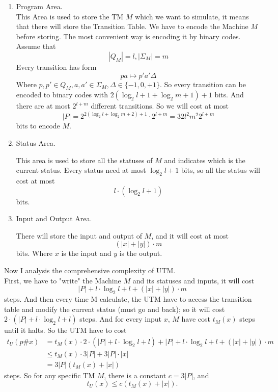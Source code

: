 \documentclass[a4papper]{article}
\theoremstyle{neosn}
\begin{document}
    \begin{enumerate}
        \item Program Area.\\
            This Area is used to store the TM $M$ which we want to simulate, it means that
            there will store the Transition Table.
            We have to encode the Machine $M$ before storing.
            The most convenient way is encoding it by binary codes.
            Assume that
            \[
                |Q_M| = l, |\Sigma_M| = m
            \]
            Every transition has form
            \[
                pa \mapsto p'a'\Delta
            \]
            Where $p,p' \in Q_M, a,a' \in \Sigma_M, \Delta \in \{-1,0,+1\}$.
            So every transition can be encoded to binary codes with $2(\log_2 l + 1 + \log_2 m + 1)+1$ bits.
            And there are at most $2^{l+m}$ different transitions.
            So we will cost at most
            \[
                |P| = 2^{2(\log_2 l + \log_2 m +2) + 1} \cdot 2^{l+m} = 32l^2 m^2 2^{l+m}
            \]
            bits to encode $M$. \\

        \item Status Area.

            This area is used to store all the statuses of $M$ and indicates which is the current status.
            Every status need at most $\log_2 l + 1$ bits, so all the status will cost at most
            \[
                l \cdot (\log_2 l + 1)
            \]
            bits.

        \item Input and Output Area.

            There will store the input and output of $M$, and it will cost at most
            \[
                (|x| + |y|) \cdot m
            \]
            bits.
            Where $x$ is the input and $y$ is the output.
    \end{enumerate}

    Now I analysis the comprehensive complexity of UTM. \\

    First, we have to "write" the Machine $M$ and its statuses and inputs, it will cost
    \[
        |P| + l\cdot \log_2 l + l + (|x|+|y|) \cdot m
    \]
    steps.
    And then every time M calculate, the UTM have to access the transition table and modify the
    current status (must go and back);
    so it will cost $2\cdot(|P| + l\cdot \log_2 l+l)$ steps.
    And for every input $x$, $M$ have cost $t_M(x)$ steps until it halts.
    So the UTM have to cost
    \[
        \begin{array}{ll}
            t_U(p\#x) & = t_M(x)\cdot 2\cdot (|P| + l\cdot \log_2 l+l) + |P| + l\cdot \log_2 l + l + (|x|+|y|) \cdot m \\
            &\leqslant t_M(x)\cdot 3|P| + 3|P| \cdot |x| \\
            & = 3|P|(t_M(x)+|x|)
        \end{array}
    \]
    steps.
    So for any specific TM $M$, there is a constant $c=3|P|$, and
    \[
        t_U(x) \leqslant c(t_M(x) + |x|).
    \]
\end{document}
